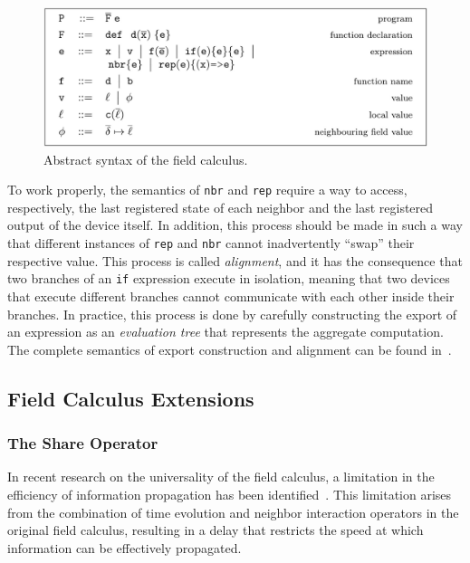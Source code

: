 \begin{figure}
    \centering
    \includegraphics[width=\linewidth]{figures/field-calculus-syntax.jpg}
    \caption{Abstract syntax of the field calculus.}
    \label{fig:field-calculus-syntax}
\end{figure}

To work properly, the semantics of \texttt{nbr} and \texttt{rep} require a way to access, respectively, the last registered state of each neighbor and the last registered output of the device itself. In addition, this process should be made in such a way that different instances of \texttt{rep} and \texttt{nbr} cannot inadvertently ``swap'' their respective value. This process is called \textit{alignment}, and it has the consequence that two branches of an \texttt{if} expression execute in isolation, meaning that two devices that execute different branches cannot communicate with each other inside their branches. In practice, this process is done by carefully constructing the export of an expression as an \textit{evaluation tree} that represents the aggregate computation. The complete semantics of export construction and alignment can be found in~\cite{Viroli2018}.

\subsection{Field Calculus Extensions}

\subsubsection{The Share Operator}

In recent research on the universality of the field calculus, a limitation in the efficiency of information propagation has been identified~\cite{Audrito2018}. This limitation arises from the combination of time evolution and neighbor interaction operators in the original field calculus, resulting in a delay that restricts the speed at which information can be effectively propagated.

